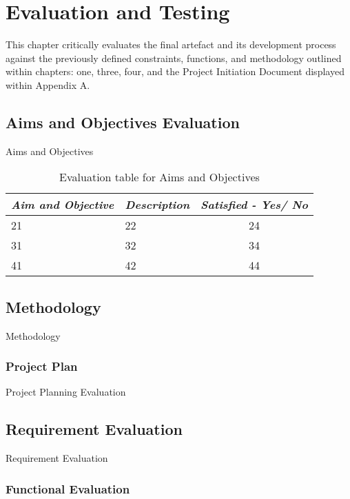 \chapter{Evaluation and Testing}

This chapter critically evaluates the final artefact and its development process against the previously defined constraints, functions, and methodology outlined within chapters: one, three, four, and the Project Initiation Document displayed within Appendix A.

\section{Aims and Objectives Evaluation}

Aims and Objectives

\begin{table}[H]
    \centering
    \begin{tabular}{lll}
    \hline
    \multicolumn{1}{|l|}{\textit{\textbf{Aim and Objective}}} & \multicolumn{1}{l|}{\textit{\textbf{Description}}} & \multicolumn{1}{l|}{\textit{\textbf{Satisfied - Yes/ No}}} \\ \hline
    21 & 22 & \multicolumn{1}{c|}{24} \\
    31 & 32 & \multicolumn{1}{c|}{34} \\
    41 & 42 & \multicolumn{1}{c|}{44} \\ \hline
    \end{tabular}
    \caption{Evaluation table for Aims and Objectives}
    \label{tab:EvaluationAimsAndObjectives}
\end{table}

\section{Methodology}

Methodology

\subsection{Project Plan}

Project Planning Evaluation

\section{Requirement Evaluation}

Requirement Evaluation

\subsection{Functional Evaluation}


